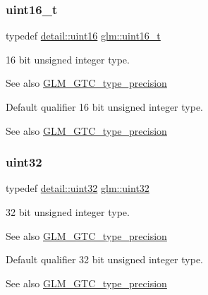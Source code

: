 \subsubsection{\texorpdfstring{uint16\+\_\+t}{uint16\_t}}
{\footnotesize\ttfamily typedef \hyperlink{namespaceglm_1_1detail_a47b2a7d006d187338e8031a352d1ce56}{detail\+::uint16} \hyperlink{group__gtc__type__precision_gac4eb4f43cae8129b00086dc234d3b8fc}{glm\+::uint16\+\_\+t}}

16 bit unsigned integer type. \begin{DoxySeeAlso}{See also}
\hyperlink{group__gtc__type__precision}{G\+L\+M\+\_\+\+G\+T\+C\+\_\+type\+\_\+precision}
\end{DoxySeeAlso}
Default qualifier 16 bit unsigned integer type. \begin{DoxySeeAlso}{See also}
\hyperlink{group__gtc__type__precision}{G\+L\+M\+\_\+\+G\+T\+C\+\_\+type\+\_\+precision} 
\end{DoxySeeAlso}
\mbox{\label{group__gtc__type__precision_ga202b6a53c105fcb7e531f9b443518451}} 
\subsubsection{\texorpdfstring{uint32}{uint32}}
{\footnotesize\ttfamily typedef \hyperlink{namespaceglm_1_1detail_ade6cfbf377022aaa391af8cd50489222}{detail\+::uint32} \hyperlink{group__gtc__type__precision_ga202b6a53c105fcb7e531f9b443518451}{glm\+::uint32}}

32 bit unsigned integer type. \begin{DoxySeeAlso}{See also}
\hyperlink{group__gtc__type__precision}{G\+L\+M\+\_\+\+G\+T\+C\+\_\+type\+\_\+precision}
\end{DoxySeeAlso}
Default qualifier 32 bit unsigned integer type. \begin{DoxySeeAlso}{See also}
\hyperlink{group__gtc__type__precision}{G\+L\+M\+\_\+\+G\+T\+C\+\_\+type\+\_\+precision} 
\end{DoxySeeAlso}
\mbox{\label{group__gtc__type__precision_ga822ca53a9ad412504532838906276a99}} 
